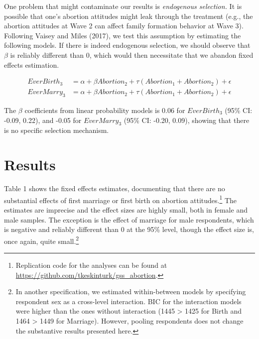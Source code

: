 \documentclass[
]{article}
\begin{document}
One problem that might contaminate our results is \emph{endogenous selection.} It is possible that one's abortion attitudes might leak through the treatment (e.g., the abortion attitudes at Wave 2 can affect family formation behavior at Wave 3). Following Vaisey and Miles (2017), we test this assumption by estimating the following models. If there is indeed endogenous selection, we should observe that \(\beta\) is reliably different than 0, which would then necessitate that we abandon fixed effects estimation.

\[
\begin{aligned}
EverBirth_3 &= \alpha + \beta Abortion_2 + \tau (Abortion_1 + Abortion_2) + \epsilon
\\
EverMarry_3 &= \alpha + \beta Abortion_2 + \tau (Abortion_1 + Abortion_2) + \epsilon
\end{aligned}
\]

The \(\beta\) coefficients from linear probability models is 0.06 for \(EverBirth_3\) (95\% CI: -0.09, 0.22), and -0.05 for \(EverMarry_3\) (95\% CI: -0.20, 0.09), showing that there is no specific selection mechanism.

\hypertarget{results}{%
\section{Results}\label{results}}

Table 1 shows the fixed effects estimates, documenting that there are no substantial effects of first marriage or first birth on abortion attitudes.\footnote{Replication code for the analyses can be found at \url{https://github.com/tkeskinturk/gss_abortion}.} The estimates are imprecise and the effect sizes are highly small, both in female and male samples. The exception is the effect of marriage for male respondents, which is negative and reliably different than 0 at the 95\% level, though the effect size is, once again, quite small.\footnote{In another specification, we estimated within-between models by specifying respondent sex as a cross-level interaction. BIC for the interaction models were higher than the ones without interaction (1445 \textgreater{} 1425 for Birth and 1464 \textgreater{} 1449 for Marriage). However, pooling respondents does not change the substantive results presented here.}
\end{document}
